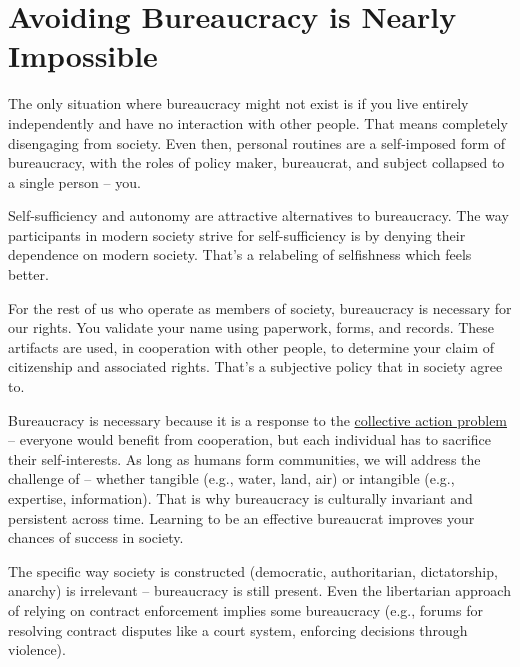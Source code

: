 \section{Avoiding Bureaucracy is Nearly Impossible}

The only situation where bureaucracy might not exist is if you live entirely independently and have no interaction with other people. That means completely disengaging from society. Even then, personal routines are a self-imposed form of bureaucracy, with the roles of policy maker, bureaucrat, and subject collapsed to a single person -- you.

Self-sufficiency and autonomy are attractive alternatives to bureaucracy. The way participants in modern society strive for self-sufficiency is by denying their dependence on modern society. That's a relabeling of selfishness which feels better. 

For the rest of us who operate as members of  society, bureaucracy is necessary for our rights. You validate your name using paperwork, forms, and records. These artifacts are used, in cooperation with other people, to determine your claim of citizenship and associated rights. 
That's a subjective policy that \iftoggle{glossarysubstitutionworks}{\glspl{stakeholder}}{stakeholders} in society agree to. 


Bureaucracy is necessary because it is a response to the \iftoggle{WPinmargin}{\marginpar{$>$Wikipedia: Collective action problem}}{}
\href{https://en.wikipedia.org/wiki/Collective_action_problem}{collective action problem} -- everyone would benefit from cooperation, but each individual has to sacrifice their self-interests.  
As long as humans form communities, we will address the challenge of \iftoggle{glossarysubstitutionworks}{\glspl{shared resource}}{shared resources}
 -- whether tangible (e.g., water, land, air) or intangible (e.g., expertise, information). 
That is why bureaucracy is culturally invariant and persistent across time.
Learning to be an effective bureaucrat improves your chances of success in society. 

The specific way society is constructed (democratic, authoritarian, dictatorship, anarchy) is irrelevant -- bureaucracy is still present. Even the libertarian approach of relying on contract enforcement implies some bureaucracy (e.g., forums for resolving contract disputes like a court system, enforcing decisions through violence). 


